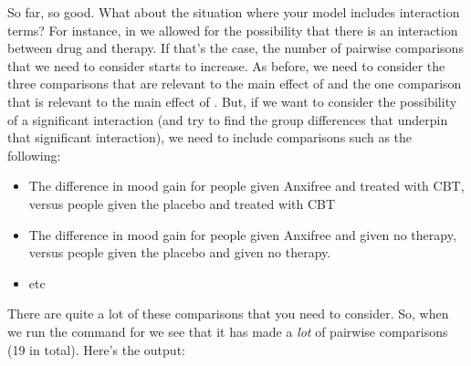 So far, so good. What about the situation where your model includes interaction terms? For instance, in  we allowed for the possibility that there is an interaction between drug and therapy. If that's the case, the number of pairwise comparisons that we need to consider starts to increase. As before, we need to consider the three comparisons that are relevant to the main effect of  and the one comparison that is relevant to the main effect of . But, if we want to consider the possibility of a significant interaction (and try to find the group differences that underpin that significant interaction), we need to include comparisons such as the following:
\begin{itemize}
\item The difference in mood gain for people given Anxifree and treated with CBT, versus people given the placebo and treated with CBT
\item The difference in mood gain for people given Anxifree and given no therapy, versus people given the placebo and given no therapy.
\item etc
\end{itemize}
There are quite a lot of these comparisons that you need to consider. So, when we run the  command for  we see that it has made a {\it lot} of pairwise comparisons (19 in total). Here's the output:
